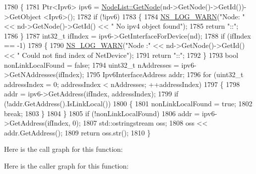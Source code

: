 \begin{DoxyCode}
1780 \{
1781   Ptr<Ipv6> ipv6 = \hyperlink{classns3_1_1NodeList_a80ac09977d48d29db5c704ac8483cf6c}{NodeList::GetNode}(nd->GetNode()->GetId())->GetObject <Ipv6>();
1782   \textcolor{keywordflow}{if} (!ipv6)
1783     \{
1784       \hyperlink{group__logging_gade7208b4009cdf0e25783cd26766f559}{NS\_LOG\_WARN}(\textcolor{stringliteral}{"Node: "} << nd->GetNode()->GetId() << \textcolor{stringliteral}{" No ipv4 object found"});
1785       \textcolor{keywordflow}{return} \textcolor{stringliteral}{"::"};
1786     \}
1787   int32\_t ifIndex = ipv6->GetInterfaceForDevice(nd);
1788   \textcolor{keywordflow}{if} (ifIndex == -1)
1789     \{
1790       \hyperlink{group__logging_gade7208b4009cdf0e25783cd26766f559}{NS\_LOG\_WARN}(\textcolor{stringliteral}{"Node :"} << nd->GetNode()->GetId() << \textcolor{stringliteral}{" Could not find index of NetDevice"});
1791       \textcolor{keywordflow}{return} \textcolor{stringliteral}{"::"};
1792     \}
1793   \textcolor{keywordtype}{bool} nonLinkLocalFound = \textcolor{keyword}{false};
1794   uint32\_t nAddresses = ipv6->GetNAddresses(ifIndex);
1795   Ipv6InterfaceAddress addr;
1796   \textcolor{keywordflow}{for} (uint32\_t addressIndex = 0; addressIndex < nAddresses; ++addressIndex)
1797     \{
1798       addr = ipv6->GetAddress(ifIndex, addressIndex);
1799       \textcolor{keywordflow}{if} (!addr.GetAddress().IsLinkLocal())
1800         \{
1801           nonLinkLocalFound = \textcolor{keyword}{true};
1802           \textcolor{keywordflow}{break};
1803         \}
1804     \}
1805   \textcolor{keywordflow}{if} (!nonLinkLocalFound)
1806     addr = ipv6->GetAddress(ifIndex, 0);
1807   std::ostringstream oss;
1808   oss << addr.GetAddress();
1809   \textcolor{keywordflow}{return} oss.str();
1810 \}
\end{DoxyCode}


Here is the call graph for this function\+:




Here is the caller graph for this function\+:


